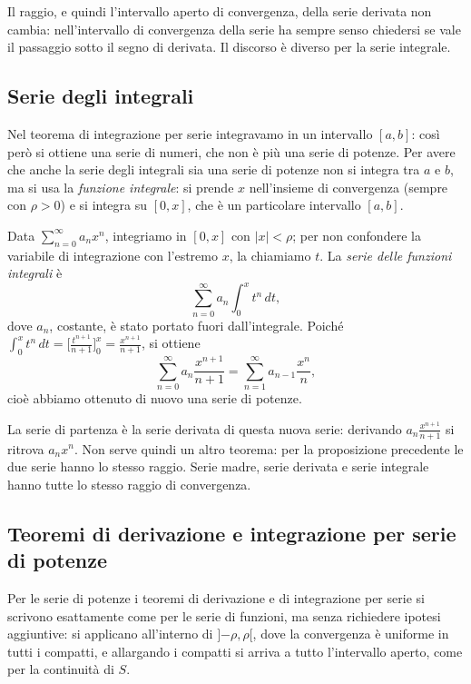Il raggio, e quindi l'intervallo aperto di convergenza, della serie derivata non cambia: nell'intervallo di
convergenza della serie ha sempre senso chiedersi se vale il passaggio sotto il segno di derivata. Il discorso
è diverso per la serie integrale.

\subsection{Serie degli integrali}

Nel teorema di integrazione per serie integravamo in un intervallo $[a,b]$: così però si ottiene una serie di
numeri, che non è più una serie di potenze.
Per avere che anche la serie degli integrali sia una serie di potenze non si integra tra $a$ e $b$, ma si usa la
\emph{funzione integrale}: si prende $x$ nell'insieme di convergenza (sempre con $\rho>0$) e si integra su
$[0,x]$, che è un particolare intervallo $[a,b]$.

Data $\sum_{n=0}^{\infty} a_n x^n$, integriamo in $[0,x]$ con $|x|<\rho$; per non confondere la variabile di
integrazione con l'estremo $x$, la chiamiamo $t$. La \emph{serie delle funzioni integrali} è
\[
  \sum_{n=0}^{\infty} a_n \int_0^x t^n\,dt ,
\]
dove $a_n$, costante, è stato portato fuori dall'integrale. Poiché
$\int_0^x t^n\,dt = \bigl[\tfrac{t^{n+1}}{n+1}\bigr]_0^x = \tfrac{x^{n+1}}{n+1}$, si ottiene
\[
  \sum_{n=0}^{\infty} a_n \frac{x^{n+1}}{n+1} = \sum_{n=1}^{\infty} a_{n-1} \frac{x^n}{n} ,
\]
cioè abbiamo ottenuto di nuovo una serie di potenze.

La serie di partenza è la serie derivata di questa nuova serie: derivando $a_n \frac{x^{n+1}}{n+1}$ si ritrova
$a_n x^n$.
Non serve quindi un altro teorema: per la proposizione precedente le due serie hanno lo stesso raggio. Serie
madre, serie derivata e serie integrale hanno tutte lo stesso raggio di convergenza.

\subsection{Teoremi di derivazione e integrazione per serie di potenze}

Per le serie di potenze i teoremi di derivazione e di integrazione per serie si scrivono esattamente come per le
serie di funzioni, ma senza richiedere ipotesi aggiuntive: si applicano all'interno di $]{-\rho},\rho[$, dove la
convergenza è uniforme in tutti i compatti, e allargando i compatti si arriva a tutto l'intervallo aperto, come
per la continuità di $S$.

